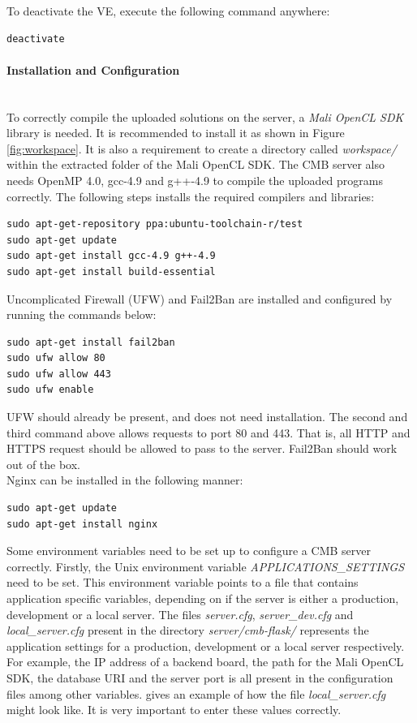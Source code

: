 To deactivate the VE, execute the following command anywhere:
\begin{lstlisting}[language=sh]
deactivate
\end{lstlisting}

\paragraph*{Installation and Configuration} \hfill \\
To correctly compile the uploaded solutions on the server, a \textit{Mali OpenCL SDK} \cite{MALI} library is needed. It is recommended to install it as shown in Figure \ref{fig:workspace}. It is also a requirement to create a directory called \textit{workspace/} within the extracted folder of the Mali OpenCL SDK. The CMB server also needs OpenMP 4.0, gcc-4.9 and g++-4.9 to compile the uploaded programs correctly. The following steps installs the required compilers and libraries:
\begin{lstlisting}
sudo apt-get-repository ppa:ubuntu-toolchain-r/test
sudo apt-get update
sudo apt-get install gcc-4.9 g++-4.9
sudo apt-get install build-essential
\end{lstlisting}

Uncomplicated Firewall (UFW) \cite{UFW} and Fail2Ban \cite{F2B} are installed and configured by running the commands below:
\begin{lstlisting}
sudo apt-get install fail2ban
sudo ufw allow 80
sudo ufw allow 443
sudo ufw enable
\end{lstlisting}
UFW should already be present, and does not need installation. The second and third command above allows requests to port 80 and 443. That is, all HTTP and HTTPS request should be allowed to pass to the server. Fail2Ban should work out of the box.\\

Nginx \cite{NGINX} can be installed in the following manner:
\begin{lstlisting}
sudo apt-get update
sudo apt-get install nginx
\end{lstlisting}

Some environment variables need to be set up to configure a CMB server correctly. Firstly, the Unix environment variable \textit{APPLICATIONS\_SETTINGS} need to be set. This environment variable points to a file that contains application specific variables, depending on if the server is either a production, development or a local server. The files \textit{server.cfg}, \textit{server\_dev.cfg} and \textit{local\_server.cfg} present in the directory \textit{server/cmb-flask/} represents the application settings for a production, development or a local server respectively. For example, the IP address of a backend board, the path for the Mali OpenCL SDK, the database URI and the server port is all present in the configuration files among other variables.  gives an example of how the file \textit{local\_server.cfg} might look like. It is very important to enter these values correctly. \\

